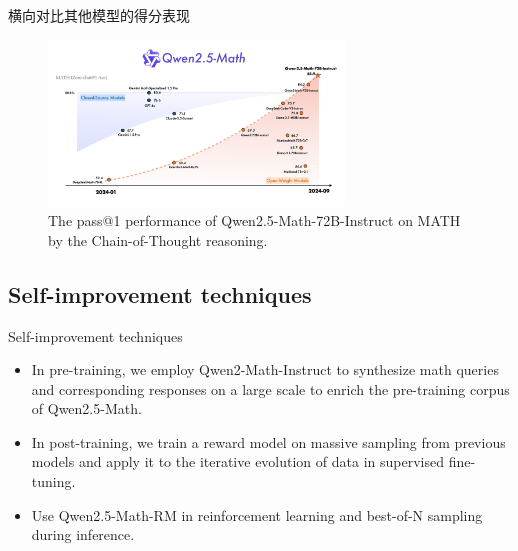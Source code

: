 \documentclass[aspectratio=169]{beamer}
\begin{document}
\begin{frame}{横向对比其他模型的得分表现}
	\begin{figure}[htbp]
		\centering
		\includegraphics[width=0.7\textwidth]{pic/flagship.png}
		\caption{The pass@1 performance of Qwen2.5-Math-72B-Instruct on MATH by the Chain-of-Thought reasoning.}
		\label{fig:intro}
	\end{figure}
\end{frame}

\subsection{Self-improvement techniques}
\begin{frame}{Self-improvement techniques}
	\begin{itemize}
		\item In pre-training, we employ Qwen2-Math-Instruct to synthesize math queries and corresponding responses on a large scale to enrich the pre-training corpus of Qwen2.5-Math.\\[0.2cm]
		      \pause
		\item In post-training, we train a reward model on massive sampling from previous models and apply it to the iterative evolution of data in supervised fine-tuning.\\[0.2cm]
		      \pause
		\item Use Qwen2.5-Math-RM in reinforcement learning and best-of-N sampling during inference.
	\end{itemize}

\end{frame}
\end{document}
